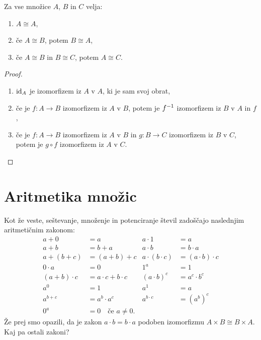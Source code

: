 \begin{trditev}
  Za vse množice $A$, $B$ in $C$ velja:
  \begin{enumerate}
  \item $A \cong A$,
  \item če $A \cong B$, potem $B \cong A$,
  \item če $A \cong B$ in $B \cong C$, potem $A \cong C$.
  \end{enumerate}
\end{trditev}

\begin{proof}
  \parbox{0pt}{}
  \begin{enumerate}
  \item $\id[A]$ je izomorfizem iz $A$ v $A$, ki je sam svoj obrat,
  \item če je $f : A \to B$ izomorfizem iz $A$ v $B$, potem je $\inv{f}$ izomorfizem iz
    $B$ v $A$ in $f$,
  \item če je $f : A \to B$ izomorfizem iz $A$ v $B$ in $g : B \to C$ izomorfizem iz $B$ v
    $C$, potem je $g \circ f$ izomorfizem iz $A$ v $C$. \qedhere
  \end{enumerate}
\end{proof}


\section{Aritmetika množic}
\label{sec:aritmetika-mnozic}

Kot že veste, seštevanje, množenje in potenciranje števil zadoščajo naslednjim
aritmetičnim zakonom:
%
\begin{align*}
  a + 0 &= a                   &     a \cdot 1 &= a \\
  a + b &= b + a               &     a \cdot b &= b \cdot a \\
  a + (b + c) &= (a + b) + c   &     a \cdot (b \cdot c) &= (a \cdot b) \cdot c \\[1ex]
  0 \cdot a &= 0                           &   1^a &= 1 \\
  (a + b) \cdot c &= a \cdot c + b \cdot c &   (a \cdot b)^c &= a^c \cdot b^c \\[1ex]
  a^0 &= 1                     &   a^1 &= a \\
  a^{b + c} &= a^b \cdot a^c   &   a^{b \cdot c} &= (a^b)^c \\[1ex]
  0^a &= 0 \quad \text{če $a \neq 0$.}
\end{align*}
%
Že prej smo opazili, da je zakon $a \cdot b = b \cdot a$ podoben izomorfizmu
$A \times B \cong B \times A$. Kaj pa ostali zakoni?

